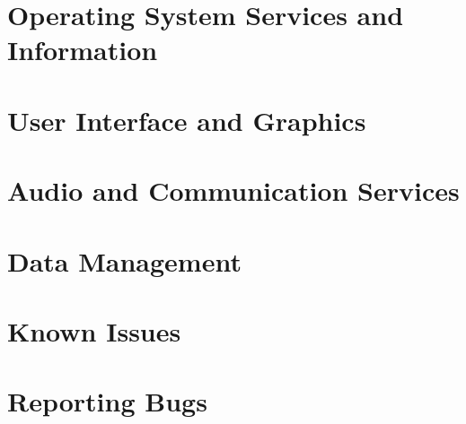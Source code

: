\documentclass{manual}
\begin{document}
\begin{flushleft}


\chapter{Operating System Services and Information \label{s60os}}




\chapter{User Interface and Graphics \label{s60graph}}












\chapter{Audio and Communication Services \label{s60ac}}









\chapter{Data Management \label{s60data}}


























\appendix

\chapter{Known Issues}

\chapter{Reporting Bugs}

\end{flushleft}
\end{document}
